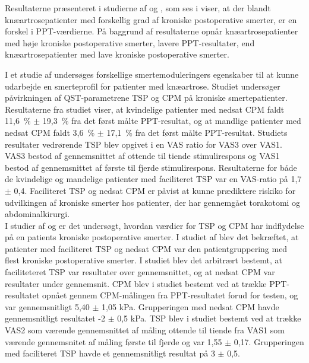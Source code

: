 Resultaterne præsenteret i studierne af  og , som ses i  viser, at der blandt knæartrosepatienter med forskellig grad af kroniske postoperative smerter, er en forskel i PPT-værdierne. På baggrund af resultaterne opnår knæartrosepatienter med høje kroniske postoperative smerter, lavere PPT-resultater, end knæartrosepatienter med lave kroniske postoperative smerter. \citep{Petersen2015} \citep{Wright2015}

I et studie af  undersøges forskellige smertemoduleringers egenskaber til at kunne udarbejde en smerteprofil for patienter med knæartrose. Studiet undersøger påvirkningen af QST-parametrene TSP og CPM på kroniske smertepatienter. Resultaterne fra studiet viser, at kvindelige patienter med nedsat CPM faldt 11,6~\% $\pm$ 19,3~\% fra det først målte PPT-resultat, og at mandlige patienter med nedsat CPM faldt 3,6~\% $\pm$ 17,1~\% fra det først målte PPT-resultat. Studiets resultater vedrørende TSP blev opgivet i en VAS ratio for VAS3 over VAS1. VAS3 bestod af gennemsnittet af ottende til tiende stimulirespons og VAS1 bestod af gennemsnittet af første til fjerde stimulirespons. Resultaterne for både de kvindelige og mandelige patienter med faciliteret TSP var en VAS-ratio på 1,7 $\pm$ 0,4. Faciliteret TSP og nedsat CPM er påvist at kunne prædiktere riskiko for udvilkingen af kroniske smerter hos patienter, der har gennemgået torakotomi og abdominalkirurgi. \citep{Vaegter2016} \\
I studier af  og  er det undersøgt, hvordan værdier for TSP og CPM har indflydelse på en patients kroniske postoperative smerter. I studiet af  blev det bekræftet, at patienter med faciliteret TSP og nedsat CPM var den patientgruppering med flest kroniske postoperative smerter. I studiet blev det arbitrært bestemt, at faciliteteret TSP var resultater over gennemsnittet, og at nedsat CPM var resultater under gennemsnit. CPM blev i studiet bestemt ved at trække PPT-resultatet opnået gennem CPM-målingen fra PPT-resultatet forud for testen, og var gennemsnitligt 5,40 $\pm$ 1,05 kPa. Grupperingen med nedsat CPM havde gennemsnitligt resultatet -2 $\pm$ 0,5 kPa. TSP blev i studiet bestemt ved at trække VAS2 som værende gennemsnittet af måling ottende til tiende fra VAS1 som værende gennemsnitet af måling første til fjerde og var 1,55 $\pm$ 0,17. Grupperingen med faciliteret TSP havde et gennemsnitligt resultat på 3 $\pm$ 0,5. 

